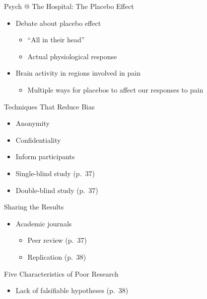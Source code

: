\documentclass[
]{book}
\providecommand{\tightlist}{%
  \setlength{\itemsep}{0pt}\setlength{\parskip}{0pt}}
\begin{document}
\begin{reflect}
Psych @ The Hospital: The Placebo Effect

\begin{itemize}
\tightlist
\item
  Debate about placebo effect

  \begin{itemize}
  \tightlist
  \item
    ``All in their head''\\
  \item
    Actual physiological response\\
  \end{itemize}
\item
  Brain activity in regions involved in pain

  \begin{itemize}
  \tightlist
  \item
    Multiple ways for placebos to affect our responses to pain
  \end{itemize}
\end{itemize}

Techniques That Reduce Bias

\begin{itemize}
\tightlist
\item
  Anonymity\\
\item
  Confidentiality\\
\item
  Inform participants\\
\item
  Single-blind study (p.~37)\\
\item
  Double-blind study (p.~37)
\end{itemize}

Sharing the Results

\begin{itemize}
\tightlist
\item
  Academic journals

  \begin{itemize}
  \tightlist
  \item
    Peer review (p.~37)\\
  \item
    Replication (p.~38)
  \end{itemize}
\end{itemize}

Five Characteristics of Poor Research

\begin{itemize}
\tightlist
\item
  Lack of falsifiable hypotheses (p.~38)


\end{itemize}
\end{reflect}
\end{document}
